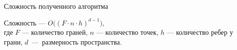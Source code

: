 \documentclass[]{beamer} %
\begin{document}





%
%

\begin{frame}{Сложность полученного алгоритма}

    Сложность --- $O\big((F\cdot n\cdot h)^{d-1}\big)$,\\
    где $F$ --- количество граней, $n$ --- количество точек, $h$ --- количество ребер у грани, $d$~---~размерность пространства.


\end{frame}
\end{document}
